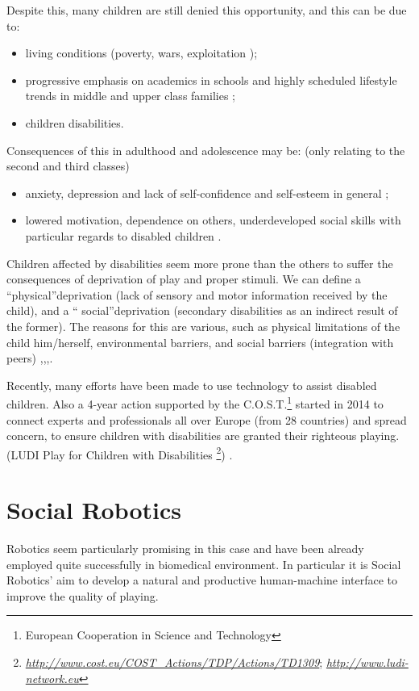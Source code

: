 \documentclass[a4paper,twoside]{book}
\begin{document}
\beforelist* Despite this, many children are still denied this opportunity, and this can be due to:
\begin{itemize}
\item living conditions (poverty, wars, exploitation \textellipsis);
\item progressive emphasis on academics in schools and highly scheduled lifestyle trends in middle and upper class families \cite{art4};
\item children disabilities.
\end{itemize}
\afterlist*
\beforelist* Consequences of this in adulthood and adolescence may be: (only relating to the second and third classes)
\begin{itemize}
\item  anxiety, depression and lack of self-confidence and self-esteem in general \cite{art4};
\item lowered motivation, dependence on others, underdeveloped social skills with particular regards to disabled children \cite{art9}.
\end{itemize}
\afterlist*
Children affected by disabilities seem more prone than the others to suffer the consequences of deprivation of play and proper stimuli. We can define a  \textquotedblleft physical\textquotedblright deprivation (lack of sensory and motor information received by the child), and a \textquotedblleft
 social\textquotedblright deprivation (secondary disabilities as an indirect result of the former). The reasons for this are various, such as physical limitations of the child him/herself, environmental barriers, and social barriers (integration with peers) \cite{art2},\cite{art4},\cite{art8},\cite{art9}.

Recently, many efforts have been made to use technology to assist disabled children. Also a 4-year action supported by the C.O.S.T.\footnote{European Cooperation in Science and Technology} started in 2014 to connect experts and professionals all over Europe (from 28 countries) and spread concern, to ensure children with disabilities are granted their righteous playing. (LUDI \textemdash Play for Children with Disabilities \footnote{\textit\underline{http://www.cost.eu/COST\_Actions/TDP/Actions/TD1309}; \textit\underline{http://www.ludi-network.eu}}) \cite{art3}.

\section{Social Robotics}
Robotics seem particularly promising in this case and have been already employed quite successfully in biomedical environment. In particular it is Social Robotics' aim to develop a natural and productive human-machine interface to improve the quality of playing.
 
\end{document}

